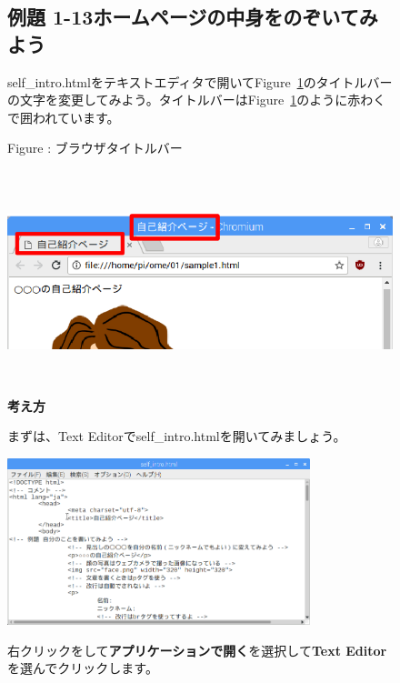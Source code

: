 \documentclass[a4paper,12pt]{jarticle}
\newcounter{Figure}
\renewcommand\theFigure{\arabic{Figure}}
\begin{document}
\clearpage
\begin{figure}[ht]
\subsection{例題
1-13ホームページの中身をのぞいてみよう}
self\_intro.htmlをテキストエディタで開いてFigure~\ref{seq:refFigure31}のタイトルバーの文字を変更してみよう。タイトルバーはFigure~\ref{seq:refFigure31}のように赤わくで囲われています。


\bigskip



\centering
\begin{minipage}{17.006cm}
{\upshape
Figure {\theFigure\label{seq:refFigure31}}:
ブラウザタイトルバー}
\end{minipage}

\centering
\includegraphics[width=17.006cm,height=6.482cm]{textbook-img143.png}
\flushleft
\textbf{考え方}

\begin{minipage}{\textwidth}
	\flushleft
まずは、Text
Editorでself\_intro.htmlを開いてみましょう。

\centering
\includegraphics[width=8.805cm,height=4.856cm]{textbook-img144.png}
\bigskip

	\flushleft
右クリックをして\textbf{アプリケーションで開く}を選択して\textbf{Text
Editor}を選んでクリックします。
\centering


\end{minipage}
\end{figure}
\end{document}
